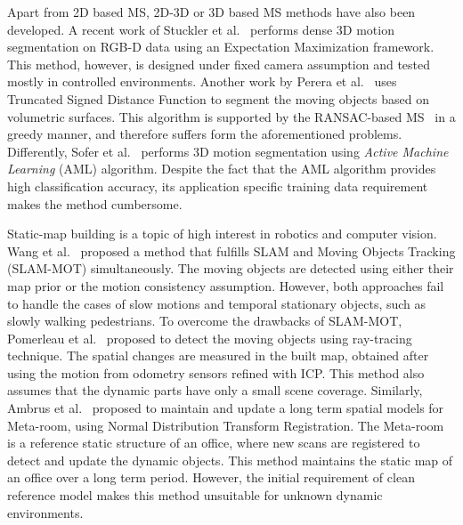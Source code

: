 \documentclass[10pt,twocolumn,letterpaper]{article}  %
\begin{document}
Apart from 2D based MS, 2D-3D or 3D  based MS methods have also been developed. A recent work of Stuckler et al.~\cite{c18} performs dense 3D motion segmentation on RGB-D data using an Expectation Maximization framework. This method, however, is designed under fixed camera assumption and tested mostly in controlled environments. Another work by Perera et al.~\cite{c21} uses Truncated Signed Distance Function to segment the moving objects based on volumetric surfaces. This algorithm is supported by the RANSAC-based MS~\cite{c16} in a greedy manner, and therefore suffers form the aforementioned problems. Differently, Sofer et al.~\cite{c19} performs 3D motion segmentation using \textit{Active Machine Learning} (AML) \cite{c20} algorithm. Despite the fact that the AML algorithm provides high classification accuracy, its application specific training data requirement makes the method cumbersome. 


Static-map building is a topic of high interest in robotics and computer vision. Wang et al.~\cite{c26} proposed a method that fulfills SLAM and Moving Objects Tracking (SLAM-MOT) simultaneously. The moving objects are detected using either their map prior or the motion consistency assumption. However, both approaches fail to handle the cases of slow motions and temporal stationary objects, such as slowly walking pedestrians. To overcome the drawbacks of SLAM-MOT, Pomerleau et al.~\cite{c27} proposed to detect the moving objects using ray-tracing technique. The spatial changes are measured in the built map, obtained after using the motion from odometry sensors refined with ICP. This method also assumes that the dynamic parts have only a small scene coverage. Similarly, Ambrus et al.~\cite{c28} proposed to maintain and update a long term spatial models for Meta-room, using Normal Distribution Transform Registration. The Meta-room is a reference static structure of an office, where new scans are registered to detect and update the dynamic objects. This method maintains the static map of an office over a long term period. However, the initial requirement of clean reference model makes this method unsuitable for unknown dynamic environments. 
\end{document}
